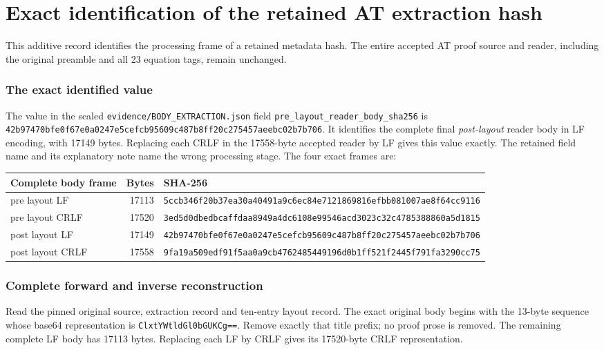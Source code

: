 \begingroup

\section{Exact identification of the retained AT extraction hash}


\begingroup
\small

This additive record identifies the processing frame of a retained metadata
hash. The entire accepted AT proof source and reader, including the original
preamble and all 23 equation tags, remain unchanged.

\subsubsection{The exact identified value}
The value in the sealed
\nolinkurl{evidence/BODY_EXTRACTION.json} field
\nolinkurl{pre_layout_reader_body_sha256} is
\nolinkurl{42b97470bfe0f67e0a0247e5cefcb95609c487b8ff20c275457aeebc02b7b706}.
It identifies the complete final \emph{post-layout} reader body in LF
encoding, with 17149 bytes. Replacing each CRLF in the 17558-byte accepted
reader by LF gives this value exactly. The retained field name and its
explanatory note name the wrong processing stage. The four exact frames are:

\begin{longtable}{@{}p{.23\linewidth}r p{.57\linewidth}@{}}
\toprule Complete body frame & Bytes & SHA-256 \\
\midrule
pre layout LF & 17113 & \nolinkurl{5ccb346f20b37ea30a40491a9c6ec84e7121869816efbb081007ae8f64cc9116} \\
pre layout CRLF & 17520 & \nolinkurl{3ed5d0dbedbcaffdaa8949a4dc6108e99546acd3023c32c4785388860a5d1815} \\
post layout LF & 17149 & \nolinkurl{42b97470bfe0f67e0a0247e5cefcb95609c487b8ff20c275457aeebc02b7b706} \\
post layout CRLF & 17558 & \nolinkurl{9fa19a509edf91f5aa0a9cb4762485449196d0b1ff521f2445f791fa3290cc75} \\
\bottomrule
\end{longtable}

\subsubsection{Complete forward and inverse reconstruction}
Read the pinned original source, extraction record and ten-entry layout
record. The exact original body begins with the 13-byte sequence whose
base64 representation is \nolinkurl{ClxtYWtldGl0bGUKCg==}.
Remove exactly that title prefix; no proof prose is removed.
The remaining complete LF body has 17113 bytes. Replacing each LF by CRLF
gives its 17520-byte CRLF representation.

